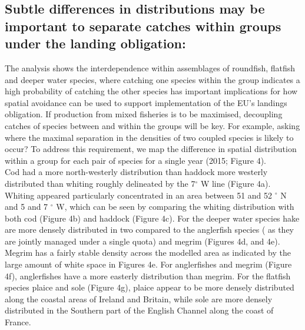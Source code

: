 \documentclass[fleqn,10pt]{wlscirep}
\begin{document}
\begin{linenumbers}
\subsection*{Subtle differences in distributions may be important to separate
	catches within groups under the landing obligation:\\} The analysis
shows the interdependence within  assemblages of
roundfish, flatfish and deeper water species, where catching one species within
the group indicates a high probability of catching the other
species has important implications for how
spatial avoidance can be used to support implementation of the EU's landings
obligation. If production from mixed fisheries is to be maximised, decoupling
catches of species between and within the groups will be key. For example,
asking where the maximal separation in the densities of two coupled species is
likely to occur? To address this requirement, we map the difference in spatial
distribution within a group for each pair of
species for a single year (2015;
Figure 4). \\

Cod had a more north-westerly distribution than haddock  more westerly distributed than whiting roughly
delineated by the 7$^{\circ}$ W line (Figure 4a). Whiting appeared particularly
concentrated in an area between 51 and 52 $^{\circ}$ N and 5 and 7 $^{\circ}$
W, which can be seen by comparing the whiting distribution with both cod
(Figure 4b) and haddock (Figure 4c). For the deeper water species hake are more
densely distributed in two  compared to the anglerfish species
( as they are jointly managed under a single quota) and megrim
(Figures 4d, and
4e). Megrim has a fairly stable density across the modelled area as indicated
by the large amount of white space in Figures 4e. For anglerfishes and megrim
(Figure 4f), anglerfishes have a more easterly distribution than megrim.  For
the flatfish species plaice and sole (Figure 4g), plaice appear to be more
densely distributed along the coastal areas of Ireland and Britain, while sole
are more densely distributed in the Southern part of the English Channel along
the coast of France.\\


\end{linenumbers}
\end{document}
